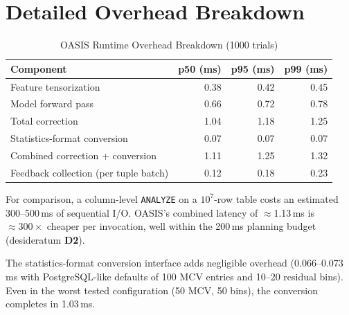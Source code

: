 \documentclass[11pt]{article}
\begin{document}
\section{Detailed Overhead Breakdown}
\label{sec:overhead-app}

\begin{table}[h]
\centering
\caption{OASIS Runtime Overhead Breakdown (1000 trials)}
\label{tab:overhead}
\begin{tabular}{l r r r}
\toprule
Component & p50 (ms) & p95 (ms) & p99 (ms) \\
\midrule
Feature tensorization       & 0.38 & 0.42 & 0.45 \\
Model forward pass          & 0.66 & 0.72 & 0.78 \\
Total correction            & 1.04 & 1.18 & 1.25 \\
Statistics-format conversion & 0.07 & 0.07 & 0.07 \\
Combined correction + conversion & 1.11 & 1.25 & 1.32 \\
\midrule
Feedback collection (per tuple batch) & 0.12 & 0.18 & 0.23 \\
\bottomrule
\end{tabular}
\end{table}

For comparison, a column-level \texttt{ANALYZE} on a $10^7$-row table costs an
estimated 300--500\,ms of sequential I/O. OASIS's combined latency of
$\approx$1.13\,ms is ${\approx}300\times$ cheaper per invocation, well within
the 200\,ms planning budget (desideratum \textbf{D2}).

The statistics-format conversion interface adds negligible overhead
(0.066--0.073\,ms with PostgreSQL-like defaults of 100 MCV entries and 10--20
residual bins). Even in the worst tested configuration (50 MCV, 50 bins), the
conversion completes in 1.03\,ms.



\end{document}
